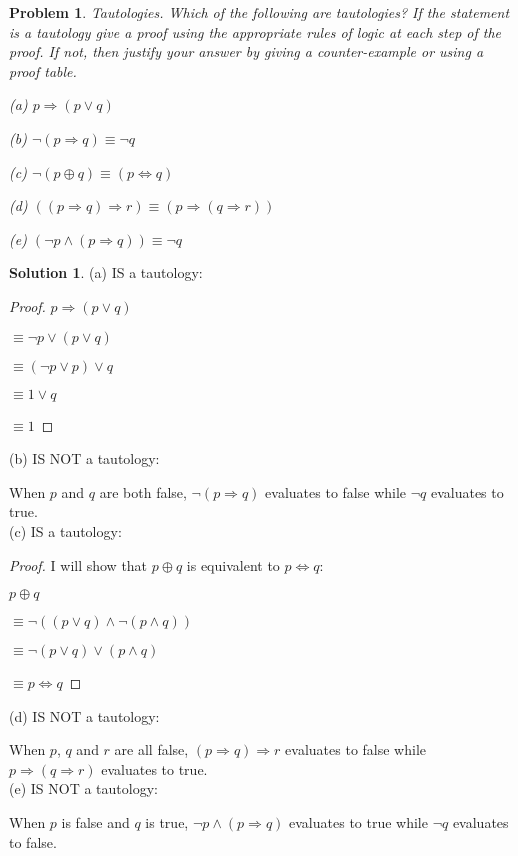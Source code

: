 \documentclass{article}
\newtheorem{problem}{Problem}
\theoremstyle{definition}
\newtheorem*{solution}{Solution}
\begin{document}
\begin{problem}

Tautologies. Which of the following are tautologies? If the statement is a
tautology give a proof using the appropriate rules of logic at each step of the proof. If not, then justify your answer by giving a counter-example or using a proof table.

(a) \(p \Rightarrow (p \vee q) \)

(b) \( \neg (p \Rightarrow q) \equiv \neg q \)

(c) \( \neg (p \oplus q) \equiv (p \Leftrightarrow q) \)

(d) \( ((p\Rightarrow q)\Rightarrow r) \equiv (p\Rightarrow (q\Rightarrow r)) \)

(e) \( (\neg p \wedge (p\Rightarrow q)) \equiv \neg q \)

\end{problem}

\begin{solution}

(a) IS a tautology:

\begin{proof}

\(p \Rightarrow (p \vee q) \)

\(\equiv \neg p \vee (p \vee q) \)

\(\equiv (\neg p \vee p) \vee q \)

\(\equiv 1 \vee q \)

\(\equiv 1 \)

\end{proof}

(b) IS NOT a tautology:

When \(p\) and \(q\) are both false, \(\neg (p\Rightarrow q)\) evaluates to false while \(\neg q\) evaluates to true. \\

(c) IS a tautology:

\begin{proof} I will show that \(p \oplus q\) is equivalent to \(p \Leftrightarrow q\):

\(p \oplus q\)

\(\equiv \neg ((p \vee q)\wedge \neg (p \wedge q)) \)

\(\equiv \neg (p \vee q)\vee (p \wedge q) \)

\(\equiv p \Leftrightarrow q \)

\end{proof} 

(d) IS NOT a tautology:

When \(p\), \(q\) and \(r\) are all false, \( (p \Rightarrow q) \Rightarrow r \) evaluates to false while \\ \( p \Rightarrow (q \Rightarrow r ) \) evaluates to true. \\

(e) IS NOT a tautology:

When \(p\) is false and \(q\) is true, \(\neg p \wedge (p\Rightarrow q)\) evaluates to true while \(\neg q\) evaluates to false.

\end{solution}
\end{document}

